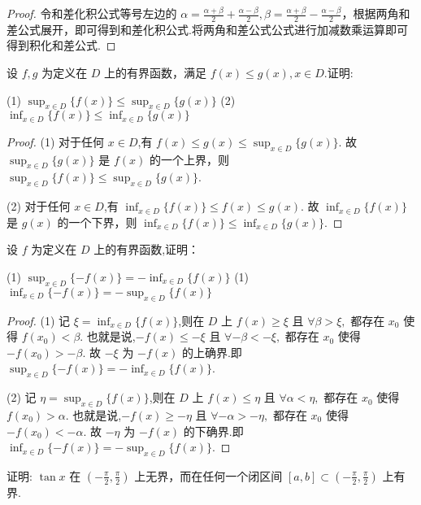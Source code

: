 \begin{proof}
    令和差化积公式等号左边的 $\alpha=\frac{\alpha+\beta}{2}+\frac{\alpha-\beta}{2},\beta=\frac{\alpha+\beta}{2}-\frac{\alpha-\beta}{2}$，根据两角和差公式展开，即可得到和差化积公式.将两角和差公式公式进行加减数乘运算即可得到积化和差公式.
\end{proof}

\begin{practice}
    设 $f,g$ 为定义在 $D$ 上的有界函数，满足 $f(x)\le g(x),x\in D$.证明:

    (1) $\sup_{x\in D} \{f(x)\}\le \sup_{x\in D} \{g(x)\}$ \qquad
    (2) $\inf_{x\in D} \{f(x)\}\le \inf_{x\in D} \{g(x)\}$
\end{practice}

\begin{proof}
    (1) 对于任何 $x\in D$,有 $ f(x)\le g(x)\le \sup_{x\in D} \{g(x)\}$. 故 $\sup_{x\in D} \{g(x)\}$ 是 $f(x)$ 的一个上界，则 $\sup_{x\in D} \{f(x)\}\le \sup_{x\in D} \{g(x)\}$.

    (2) 对于任何 $x\in D$,有 $\inf_{x\in D} \{f(x)\}\le f(x)\le g(x)$. 故 $\inf_{x\in D} \{f(x)\}$ 是 $g(x)$ 的一个下界，则 $\inf_{x\in D} \{f(x)\}\le \inf_{x\in D} \{g(x)\}$.
\end{proof}

\begin{practice}
设 $f$ 为定义在 $D$ 上的有界函数,证明：

    (1) $\sup_{x\in D} \{-f(x)\}=-\inf_{x\in D} \{f(x)\}$ \qquad
    (1) $\inf_{x\in D} \{-f(x)\}=-\sup_{x\in D} \{f(x)\}$
\end{practice}

\begin{proof}
    (1) 记 $\xi=\inf_{x\in D} \{f(x)\}$,则在 $D$ 上 $f(x)\ge \xi$ 且 $\forall \beta>\xi,$ 都存在 $x_0$ 使得 $f(x_0)<\beta$. 也就是说,$-f(x)\le -\xi$ 且 $\forall -\beta<-\xi,$ 都存在 $x_0$ 使得 $-f(x_0)>-\beta$. 故 $-\xi$ 为 $-f(x)$ 的上确界.即 $\sup_{x\in D} \{-f(x)\}=-\inf_{x\in D} \{f(x)\}$.

    (2) 记 $\eta=\sup_{x\in D} \{f(x)\}$,则在 $D$ 上 $f(x)\le \eta$ 且 $\forall \alpha<\eta,$ 都存在 $x_0$ 使得 $f(x_0)>\alpha$. 也就是说,$-f(x)\ge -\eta$ 且 $\forall -\alpha>-\eta,$ 都存在 $x_0$ 使得 $-f(x_0)<-\alpha$. 故 $-\eta$ 为 $-f(x)$ 的下确界.即 $\inf_{x\in D} \{-f(x)\}=-\sup_{x\in D} \{f(x)\}$.
\end{proof}

\begin{practice}
    证明: $\tan x$ 在 $(-\frac{\pi}{2},\frac{\pi}{2})$ 上无界，而在任何一个闭区间 $[a,b]\subset (-\frac{\pi}{2},\frac{\pi}{2})$ 上有界.
\end{practice}

